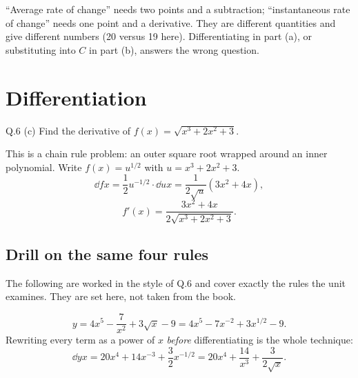 \begin{pitfall}
``Average rate of change'' needs two points and a subtraction; ``instantaneous
rate of change'' needs one point and a derivative. They are different
quantities and give different numbers (20 versus 19 here). Differentiating in
part (a), or substituting into $C$ in part (b), answers the wrong question.
\end{pitfall}

\section{Differentiation}

\begin{question}{Q.6 (c)}
Find the derivative of $f(x)=\sqrt{x^{3}+2x^{2}+3}$.
\end{question}


\begin{solution}
This is a chain rule problem: an outer square root wrapped around an inner
polynomial. Write $f(x)=u^{1/2}$ with $u=x^{3}+2x^{2}+3$.
\[
\dd{f}{x}=\frac{1}{2}u^{-1/2}\cdot\dd{u}{x}
=\frac{1}{2\sqrt{u}}\left(3x^{2}+4x\right),
\]
\[
f'(x)=\frac{3x^{2}+4x}{2\sqrt{x^{3}+2x^{2}+3}} .
\]

\end{solution}

\subsection*{Drill on the same four rules}

The following are worked in the style of Q.6 and cover exactly the rules the
unit examines. They are set here, not taken from the book.

\begin{solution}
\[
y=4x^{5}-\frac{7}{x^{2}}+3\sqrt{x}-9
=4x^{5}-7x^{-2}+3x^{1/2}-9 .
\]
Rewriting every term as a power of $x$ \emph{before} differentiating is the
whole technique:
\[
\dd{y}{x}=20x^{4}+14x^{-3}+\frac32 x^{-1/2}
=20x^{4}+\frac{14}{x^{3}}+\frac{3}{2\sqrt{x}} .
\]
\end{solution}

